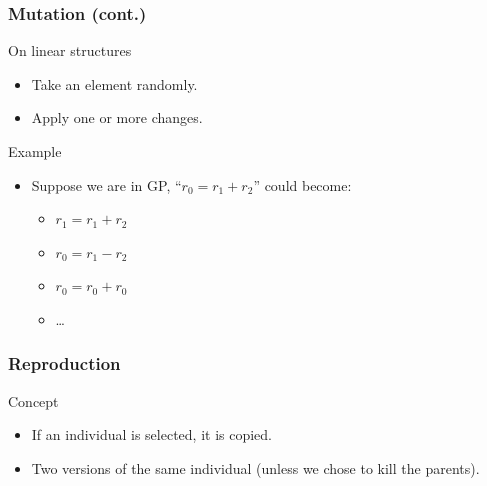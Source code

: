 \begin{frame}
  \frametitle{Mutation (cont.)}
  \begin{block}{On linear structures}
    \begin{itemize}
    \item Take an element randomly.
    \item Apply one or more changes.
    \end{itemize}
  \end{block}

  \begin{block}{Example}
    \begin{itemize}
    \item Suppose we are in GP, ``$r_0 = r_1 + r_2$'' could become:
      \begin{itemize}
      \item $r_1 = r_1 + r_2$
      \item $r_0 = r_1 - r_2$
      \item $r_0 = r_0 + r_0$
      \item \dots
      \end{itemize}
    \end{itemize}
  \end{block}
\end{frame}

\begin{frame}
  \frametitle{Reproduction}
  \begin{block}{Concept}
    \begin{itemize}
    \item If an individual is selected, it is copied.
    \item Two versions of the same individual (unless we chose to kill
      the parents).
    \end{itemize}
  \end{block}
\end{frame}

